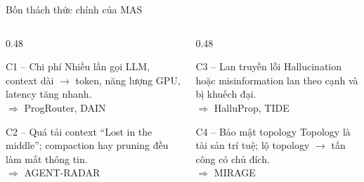 \documentclass[aspectratio=169,10pt]{beamer}
\begin{document}
\begin{frame}{Bốn thách thức chính của MAS}
  \begin{columns}[T]
    \begin{column}{0.48\textwidth}
      \begin{block}{C1 -- Chi phí}
        Nhiều lần gọi LLM, context dài $\to$ token, năng lượng GPU, latency tăng nhanh.\\
        $\Rightarrow$ ProgRouter, DAIN
      \end{block}
      \begin{block}{C2 -- Quá tải context}
        “Lost in the middle”; compaction hay pruning đều làm mất thông tin.\\
        $\Rightarrow$ AGENT-RADAR
      \end{block}
    \end{column}
    \begin{column}{0.48\textwidth}
      \begin{block}{C3 -- Lan truyền lỗi}
        Hallucination hoặc misinformation lan theo cạnh và bị khuếch đại.\\
        $\Rightarrow$ HalluProp, TIDE
      \end{block}
      \begin{block}{C4 -- Bảo mật topology}
        Topology là tài sản trí tuệ; lộ topology $\to$ tấn công có chủ đích.\\
        $\Rightarrow$ MIRAGE
      \end{block}
    \end{column}
  \end{columns}
\end{frame}
\end{document}
